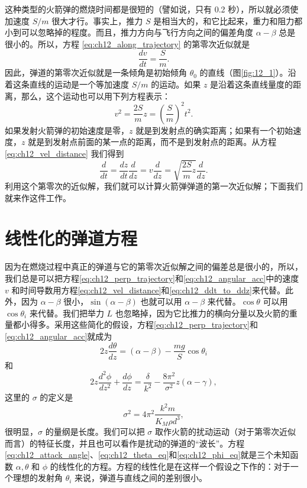 这种类型的火箭弹的燃烧时间都是很短的（譬如说，只有 0.2 秒），所以就必须使加速度 $S/m$ 很大才行。事实上，推力 $S$ 是相当大的，和它比起来，重力和阻力都小到可以忽略掉的程度。而且，推力方向与飞行方向之间的偏差角度 $\alpha-\beta$ 总是很小的。所以，方程 \eqref{eq:ch12_along_trajectory} 的第零次近似就是
\begin{equation}\label{eq:ch12_zero_approx_vel}
\frac{dv}{dt} = \frac{S}{m}.
\end{equation}
因此，弹道的第零次近似就是一条倾角是初始倾角 $\theta_0$ 的直线（图\ref{fig:12_1}）。沿着这条直线的运动是一个等加速度 $S/m$ 的运动。如果 $z$ 是沿着这条直线量度的距离，那么，这个运动也可以用下列方程表示：
\begin{equation}\label{eq:ch12_vel_distance}
v^2 = \frac{2S}{m}z = \left( \frac{S}{m} \right)^2 t^2.
\end{equation}
如果发射火箭弹的初始速度是零，$z$ 就是到发射点的确实距离；如果有一个初始速度，$z$ 就是到发射点前面的某一点的距离，而不是到发射点的距离。从方程 \eqref{eq:ch12_vel_distance} 我们得到
\begin{equation}\label{eq:ch12_ddt_to_ddz}
\frac{d}{dt} = \frac{dz}{dt} \frac{d}{dz} = v \frac{d}{dz} = \sqrt{\frac{2S}{m}z} \frac{d}{dz}.
\end{equation}
利用这个第零次的近似解，我们就可以计算火箭弹弹道的第一次近似解；下面我们就来作这件工作。


\section{线性化的弹道方程}

因为在燃烧过程中真正的弹道与它的第零次近似解之间的偏差总是很小的，所以，我们总是可以把方程\eqref{eq:ch12_perp_trajectory}和\eqref{eq:ch12_angular_acc}中的速度 $v$ 和时间导数用方程\eqref{eq:ch12_vel_distance}和\eqref{eq:ch12_ddt_to_ddz}来代替。此外，因为 $\alpha - \beta$ 很小，$\sin(\alpha - \beta)$ 也就可以用 $\alpha - \beta$ 来代替。$\cos\theta$ 可以用 $\cos\theta_i$ 来代替。我们把举力 $L$ 也忽略掉，因为它比推力的横向分量以及火箭的重量都小得多。采用这些简化的假设，方程\eqref{eq:ch12_perp_trajectory}和\eqref{eq:ch12_angular_acc}就成为
\begin{equation}\label{eq:ch12_theta_eq}
2z \frac{d\theta}{dz} = (\alpha - \beta) - \frac{mg}{S} \cos\theta_i
\end{equation}
和
\begin{equation}\label{eq:ch12_phi_eq}
2z \frac{d^2\phi}{dz^2} + \frac{d\phi}{dz} = \frac{\delta}{k^2} - \frac{8\pi^2}{\sigma^2}z(\alpha - \gamma),
\end{equation}
这里的 $\sigma$ 的定义是
\begin{equation}\label{eq:ch12_sigma_def}
\sigma^2 = 4\pi^2 \frac{k^2m}{K_M\rho d^3},
\end{equation}
很明显，$\sigma$ 的量纲是长度。我们可以把 $\sigma$ 取作火箭的扰动运动（对于第零次近似而言）的特征长度，并且也可以看作是扰动的弹道的“波长”。方程\eqref{eq:ch12_attack_angle}、\eqref{eq:ch12_theta_eq}和\eqref{eq:ch12_phi_eq}就是三个未知函数 $\alpha, \theta$ 和 $\phi$ 的线性化的方程。方程的线性化是在这样一个假设之下作的：对于一个理想的发射角 $\theta_i$ 来说，弹道与直线之间的差别很小。

